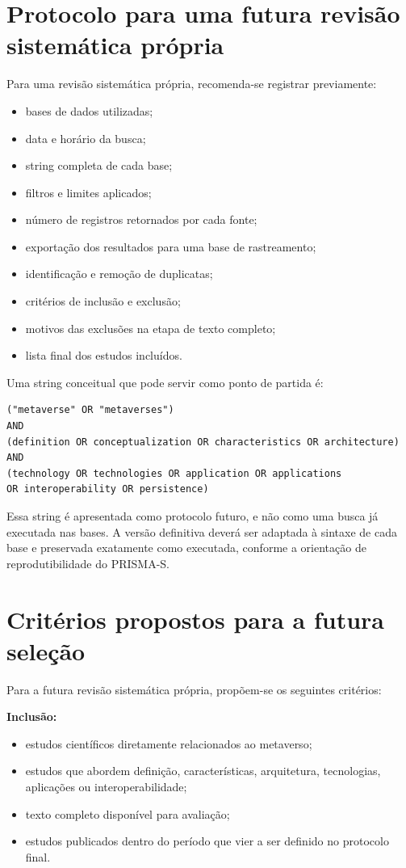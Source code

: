 \section{Protocolo para uma futura revisão sistemática própria}

Para uma revisão sistemática própria, recomenda-se registrar previamente:

\begin{itemize}
    \item bases de dados utilizadas;
    \item data e horário da busca;
    \item string completa de cada base;
    \item filtros e limites aplicados;
    \item número de registros retornados por cada fonte;
    \item exportação dos resultados para uma base de rastreamento;
    \item identificação e remoção de duplicatas;
    \item critérios de inclusão e exclusão;
    \item motivos das exclusões na etapa de texto completo;
    \item lista final dos estudos incluídos.
\end{itemize}

Uma string conceitual que pode servir como ponto de partida é:

\begin{verbatim}
("metaverse" OR "metaverses")
AND
(definition OR conceptualization OR characteristics OR architecture)
AND
(technology OR technologies OR application OR applications
OR interoperability OR persistence)
\end{verbatim}

Essa string é apresentada como protocolo futuro, e não como uma busca já executada nas bases. A versão definitiva deverá ser adaptada à sintaxe de cada base e preservada exatamente como executada, conforme a orientação de reprodutibilidade do PRISMA-S. \cite{rethlefsen2021}

\section{Critérios propostos para a futura seleção}

Para a futura revisão sistemática própria, propõem-se os seguintes critérios:

\textbf{Inclusão:}
\begin{itemize}
    \item estudos científicos diretamente relacionados ao metaverso;
    \item estudos que abordem definição, características, arquitetura, tecnologias, aplicações ou interoperabilidade;
    \item texto completo disponível para avaliação;
    \item estudos publicados dentro do período que vier a ser definido no protocolo final.
\end{itemize}

